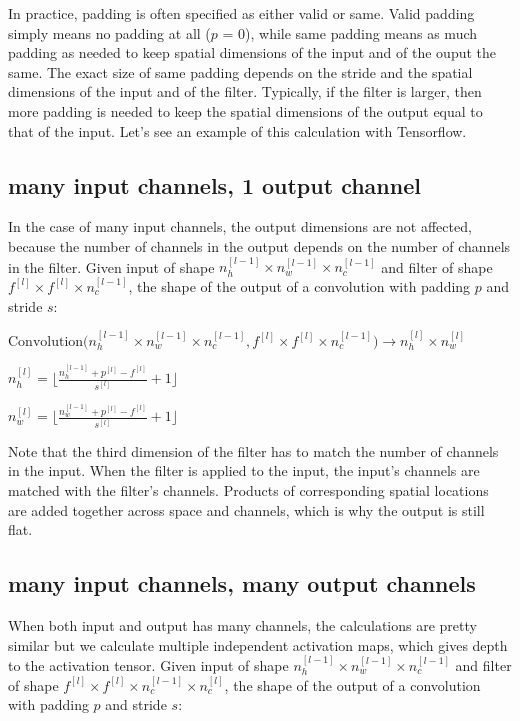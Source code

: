 \documentclass[11pt]{article}
\begin{document}
In practice, padding is often specified as either valid or same. Valid padding simply means no padding at all ($p$ = 0), while same padding means as much padding as needed to keep spatial dimensions of the input and of the ouput the same. The exact size of same padding depends on the stride and the spatial dimensions of the input and of the filter. Typically, if the filter is larger, then more padding is needed to keep the spatial dimensions of the output equal to that of the input. Let's see an example of this calculation with Tensorflow.

\subsection{many input channels, 1 output channel}

In the case of many input channels, the output dimensions are not affected, because the number of channels in the output depends on the number of channels in the filter. Given input of shape $n^{[l-1]}_h \times n^{[l-1]}_w \times n^{[l-1]}_c $ and filter of shape $f^{[l]} \times f^{[l]} \times n^{[l-1]}_c$, the shape of the output of a convolution with padding $p$ and stride $s$:

$
\text{Convolution} \big(
    n^{[l-1]}_h \times n^{[l-1]}_w \times n^{[l-1]}_c,
    f^{[l]} \times f^{[l]} \times n^{[l-1]}_c
\big)
\rightarrow n^{[l]}_h \times n^{[l]}_w
$

$ n^{[l]}_h = \big\lfloor \frac{n^{[l-1]}_h + p^{[l]} - f^{[l]}}{s^{[l]}} + 1 \big\rfloor $

$ n^{[l]}_w = \big\lfloor \frac{n^{[l-1]}_w + p^{[l]} - f^{[l]}}{s^{[l]}} + 1 \big\rfloor $

Note that the third dimension of the filter has to match the number of channels in the input. When the filter is applied to the input, the input's channels are matched with the filter's channels. Products of corresponding spatial locations are added together across space and channels, which is why the output is still flat.

\subsection{many input channels, many output channels}

When both input and output has many channels, the calculations are pretty similar but we calculate multiple independent activation maps, which gives depth to the activation tensor. Given input of shape $n^{[l-1]}_h \times n^{[l-1]}_w \times n^{[l-1]}_c $ and filter of shape $f^{[l]} \times f^{[l]} \times n^{[l-1]}_c \times n^{[l]}_c$, the shape of the output of a convolution with padding $p$ and stride $s$:
\end{document}
